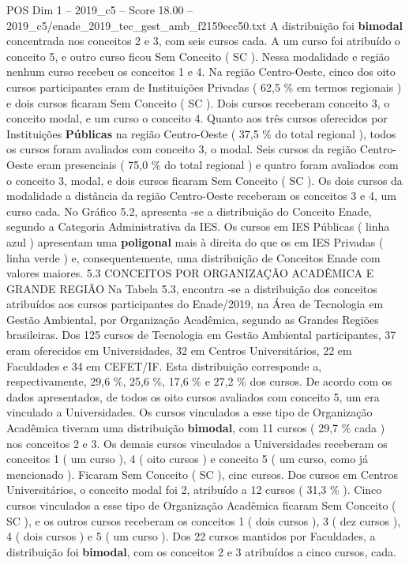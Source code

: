 \begin{textsample}{POS Dim 1 – 2019\_c5 – Score 18.00 – 2019\_c5/enade\_2019\_tec\_gest\_amb\_f2159ecc50.txt}
A distribuição foi \textbf{bimodal} concentrada nos conceitos 2 e 3, com seis cursos cada.
A um curso foi atribuído o conceito 5, e outro curso ficou Sem Conceito ( SC ).
Nessa modalidade e região nenhum curso recebeu os conceitos 1 e 4.
Na região Centro-Oeste, cinco dos oito cursos participantes eram de Instituições Privadas ( 62,5 \% em termos regionais ) e dois cursos ficaram Sem Conceito ( SC ).
Dois cursos receberam conceito 3, o conceito modal, e um curso o conceito 4.
Quanto aos três cursos oferecidos por Instituições \textbf{Públicas} na região Centro-Oeste ( 37,5 \% do total regional ), todos os cursos foram avaliados com conceito 3, o modal.
Seis cursos da região Centro-Oeste eram presenciais ( 75,0 \% do total regional ) e quatro foram avaliados com o conceito 3, modal, e dois cursos ficaram Sem Conceito ( SC ).
Os dois cursos da modalidade a distância da região Centro-Oeste receberam os conceitos 3 e 4, um curso cada.
No Gráfico 5.2, apresenta -se a distribuição do Conceito Enade, segundo a Categoria Administrativa da IES.
Os cursos em IES Públicas ( linha azul ) apresentam uma \textbf{poligonal} mais à direita do que os em IES Privadas ( linha verde ) e, consequentemente, uma distribuição de Conceitos Enade com valores maiores. 5.3 CONCEITOS POR ORGANIZAÇÃO ACADÊMICA E GRANDE REGIÃO Na Tabela 5.3, encontra -se a distribuição dos conceitos atribuídos aos cursos participantes do Enade/2019, na Área de Tecnologia em Gestão Ambiental, por Organização Acadêmica, segundo as Grandes Regiões brasileiras.
Dos 125 cursos de Tecnologia em Gestão Ambiental participantes, 37 eram oferecidos em Universidades, 32 em Centros Universitários, 22 em Faculdades e 34 em CEFET/IF.
Esta distribuição corresponde a, respectivamente, 29,6 \%, 25,6 \%, 17,6 \% e 27,2 \% dos cursos.
De acordo com os dados apresentados, de todos os oito cursos avaliados com conceito 5, um era vinculado a Universidades.
Os cursos vinculados a esse tipo de Organização Acadêmica tiveram uma distribuição \textbf{bimodal}, com 11 cursos ( 29,7 \% cada ) nos conceitos 2 e 3.
Os demais cursos vinculados a Universidades receberam os conceitos 1 ( um curso ), 4 ( oito cursos ) e conceito 5 ( um curso, como já mencionado ).
Ficaram Sem Conceito ( SC ), cinc cursos.
Dos cursos em Centros Universitários, o conceito modal foi 2, atribuído a 12 cursos ( 31,3 \% ).
Cinco cursos vinculados a esse tipo de Organização Acadêmica ficaram Sem Conceito ( SC ), e os outros cursos receberam os conceitos 1 ( dois cursos ), 3 ( dez cursos ), 4 ( dois cursos ) e 5 ( um curso ).
Dos 22 cursos mantidos por Faculdades, a distribuição foi \textbf{bimodal}, com os conceitos 2 e 3 atribuídos a cinco cursos, cada.

\end{textsample}
